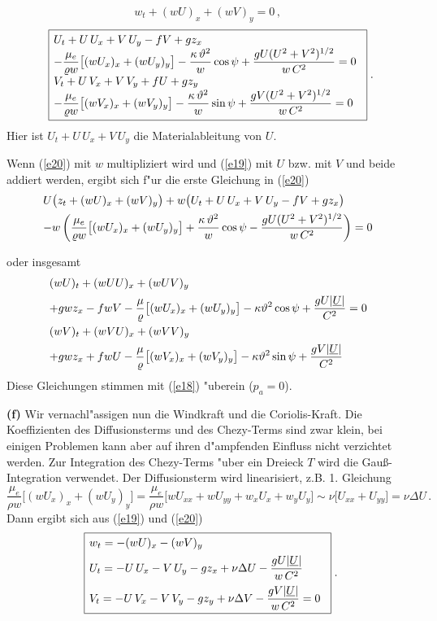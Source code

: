 \documentclass[12pt,a4paper,leqno,twoside]{book}
\begin{document}
\begin{equation} \label{e19}
w_t + (wU)_x + (wV)_y = 0\,, \;\; 
\end{equation}
%
\begin{equation}\label{e20}
\fbox{$
\ba{.}{l}
U_t + U\, U_x + V \, U_y - fV + g z_x\\
\dis -  \frac{\mu_e}{\rho w}\big[(wU_x)_x  + (wU_y)_y\big]
 - \frac{\kappa\, \theta^2}{w} \cos \psi
 + \frac{gU(U^2 + V^2)^{1/2}}{w\, C^2} = 0\\[1ex]
V_t + U\, V_x + V \, V_y + fU + g z_y\\
\dis - \frac{\mu_e}{\rho w}\big[(w V_x)_x  + (w V_y)_y\big]
- \frac{\kappa\, \theta^2}{w} \sin \psi
+ \frac{gV(U^2 + V^2)^{1/2}}{w\,C^2} = 0
\ea{.}
$}\;.
\end{equation}
%
Hier ist $U_t + U\, U_x + V \, U_y$ die Materialableitung von $U$.
\par
Wenn (\ref{e20}) mit $w$ multipliziert wird
und (\ref{e19}) mit $U$ bzw. mit $V$
und beide addiert  werden, ergibt sich f"ur die erste Gleichung in (\ref{e20})
%
\[
\ba{.}{l}
U\big(z_t + (wU)_x + (wV)_y\big) +
w\big(U_t + U\, U_x + V \, U_y - fV + g z_x\big)\\[1ex]
\dis  - w\left(  \frac{\mu_e}{\rho w}\big[(wU_x)_x  + (wU_y)_y\big]
+ \frac{\kappa\, \theta^2}{w} \cos \psi
- \frac{gU(U^2 + V^2)^{1/2}}{w\, C^2}\right) = 0
\ea{.}
\]

oder insgesamt
%
\begin{equation}\label{21}
\ba{.}{l}
(wU)_t + (wUU)_x + (wUV)_y \\[1ex]
\dis
+ gwz_x - fwV - \frac{\mu}{\rho}\big[(wU_x)_x + (wU_y)_y\big]
- \kappa \theta^2\cos \psi + \frac{gU|\ul{U}|}{C^2} = 0\\[2ex]
(wV)_t + (wVU)_x + (wVV)_y \\[1ex]
\dis
+ gwz_x + fwU - \frac{\mu}{\rho}\big[(wV_x)_x + (wV_y)_y\big]
- \kappa \theta^2\sin \psi + \frac{gV|\ul{U}|}{C^2} 
\ea{.}
\end{equation}
Diese Gleichungen stimmen mit (\ref{e18}) "uberein ($p_a = 0$).
\par\vspace{0.5ex}
{\bf (f)}
Wir vernachl"assigen nun die Windkraft und die {\sc Coriolis}-Kraft.
Die Koeffizienten des Diffusionsterms und des {\sc Chezy}-Terms sind zwar klein, bei 
einigen Problemen kann aber auf ihren d"ampfenden Einfluss nicht verzichtet werden. 
Zur Integration des {\sc Chezy}-Terms "uber ein Dreieck $T$ wird die
{\sc Gau\ss}-Integration verwendet. Der Diffusionsterm wird linearisiert, z.B. 1. 
Gleichung
%
\[
\frac{\mu_e}{\rho w}\big[(wU_x)_x  + (wU_y)_y\big]
= \frac{\mu_e}{\rho w}\big[wU_{xx}  + wU_{yy} + w_xU_x + w_yU_y\big]
\sim \nu \big[U_{xx}  + U_{yy}\big] = \nu \Delta U\,.
\]
%
Dann ergibt sich aus (\ref{e19}) und (\ref{e20})
%
\begin{equation} \label{e22}
\fbox{$
\ba{.}{l}
w_t = - (wU)_x - (wV)_y\\[1ex]
%
U_t = \dis - U\, U_x - V \, U_y - g z_x
+ \nu \Delta U  - \frac{gU|\ul{U}|}{w\, C^2}\\[2ex]
V_t = \dis - U\, V_x - V \, V_y  - g z_y
+ \nu \Delta V - \frac{gV|\ul{U}|}{w\,C^2} = 0
\ea{.}
$}\;.
\end{equation}
%
\end{document}
